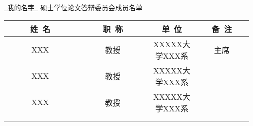 \newpage
\thispagestyle{empty}
\vspace*{2em}

\begin{center}\STSong{}
 \underline{\ 我的名字\ } 硕士学位论文答辩委员会成员名单
\end{center}

\begin{center}
\renewcommand{\arraystretch}{1.4}
  \begin{tabular}{|c|c|c|c|} \hline
   ~~~~~姓~名~~~~~ & ~~~~~职~称~~~~~ 
   & \hspace{6em}单~位\hspace{6em} & ~~~备~注~~~\\\hline
         XXX    &   教授    &  XXXXX大学XXX系  & 主席  \\ \hline
         XXX    &   教授    &  XXXXX大学XXX系  &       \\ \hline
         XXX    &   教授    &  XXXXX大学XXX系  &       \\ \hline
                &           &                   &       \\ \hline
                &           &                   &       \\ \hline
  \end{tabular}
\end{center}
